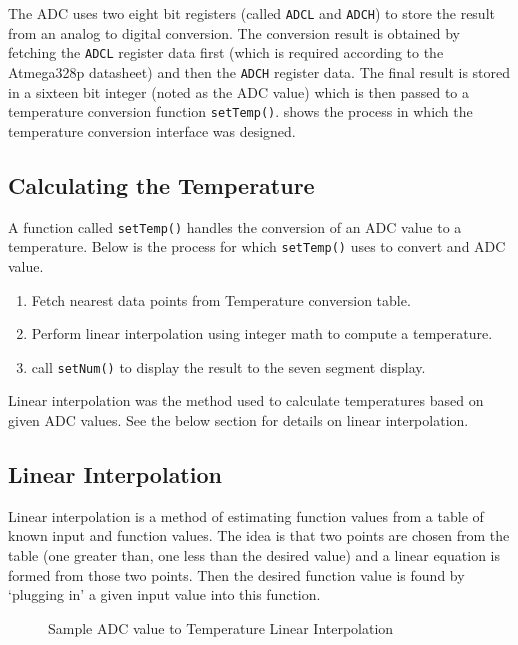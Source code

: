 \documentclass[main.tex]{subfiles}
\begin{document}
		The ADC uses two eight bit registers (called \lstinline{ADCL} and
		\lstinline{ADCH}) to store the result from an analog to digital conversion.
		The conversion result is obtained by fetching the \lstinline{ADCL} register
		data first (which is required according to the Atmega328p datasheet) and
		then the \lstinline{ADCH} register data. The final result is stored in a
		sixteen bit integer (noted as the ADC value) which is then passed to a
		temperature conversion function \lstinline{setTemp()}. 
		shows the process in which the temperature conversion interface was
		designed.

		\subsection{Calculating the Temperature}
		A function called \lstinline{setTemp()} handles the conversion of an ADC
		value to a temperature. Below is the process for which
		\lstinline{setTemp()} uses to convert and ADC value. 
	
		\begin{enumerate}
			\item Fetch nearest data points from Temperature conversion table.
			\item Perform linear interpolation using integer math to compute a
				temperature.
			\item call \lstinline{setNum()} to display the result to the seven segment
				display.
		\end{enumerate}	

		Linear interpolation was the method used to calculate temperatures based on
		given ADC values. See the below section for details on linear interpolation.

		\subsection{Linear Interpolation}
		Linear interpolation is a method of estimating function values from a table
		of known input and function values. The idea is that two points are chosen
		from the table (one greater than, one less than the desired value) and a
		linear equation is formed from those two points. Then the desired function value is
		found by `plugging in' a given input value into this function.

		\begin{figure}[H]
			\begin{center}
				
			\end{center}
			\caption{Sample ADC value to Temperature Linear Interpolation}
			\label{gph:adcTempGraph}
		\end{figure}
\end{document}
